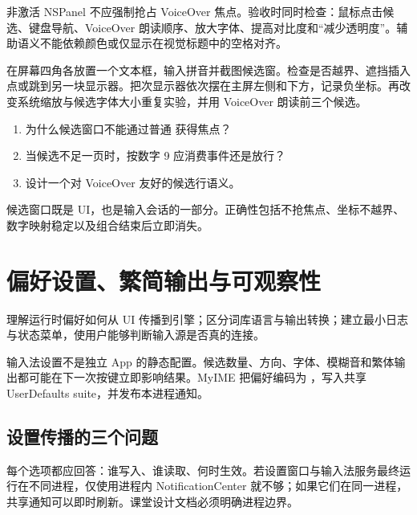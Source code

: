 非激活 NSPanel 不应强制抢占 VoiceOver 焦点。验收时同时检查：鼠标点击候选、键盘导航、VoiceOver 朗读顺序、放大字体、提高对比度和“减少透明度”。辅助语义不能依赖颜色或仅显示在视觉标题中的空格对齐。

\begin{lab}[边缘定位]
在屏幕四角各放置一个文本框，输入拼音并截图候选窗。检查是否越界、遮挡插入点或跳到另一块显示器。把次显示器依次摆在主屏左侧和下方，记录负坐标。再改变系统缩放与候选字体大小重复实验，并用 VoiceOver 朗读前三个候选。
\end{lab}

\exercises
\begin{enumerate}
  \item 为什么候选窗口不能通过普通  获得焦点？
  \item 当候选不足一页时，按数字 9 应消费事件还是放行？
  \item 设计一个对 VoiceOver 友好的候选行语义。
\end{enumerate}

\begin{summarybox}
候选窗口既是 UI，也是输入会话的一部分。正确性包括不抢焦点、坐标不越界、数字映射稳定以及组合结束后立即消失。
\end{summarybox}


\chapter{偏好设置、繁简输出与可观察性}

\begin{goals}
理解运行时偏好如何从 UI 传播到引擎；区分词库语言与输出转换；建立最小日志与状态菜单，使用户能够判断输入源是否真的连接。
\end{goals}

输入法设置不是独立 App 的静态配置。候选数量、方向、字体、模糊音和繁体输出都可能在下一次按键立即影响结果。MyIME 把偏好编码为 ，写入共享 UserDefaults suite，并发布本进程通知。



\section{设置传播的三个问题}

每个选项都应回答：谁写入、谁读取、何时生效。若设置窗口与输入法服务最终运行在不同进程，仅使用进程内 NotificationCenter 就不够；如果它们在同一进程，共享通知可以即时刷新。课堂设计文档必须明确进程边界。

